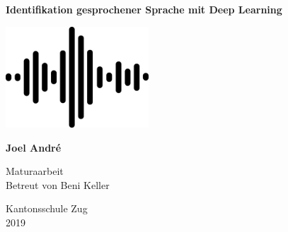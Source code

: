 \begin{titlepage}
    \begin{center}
        \vspace*{1cm}
        
        \Huge
        \textbf{Identifikation gesprochener Sprache mit Deep Learning}
            
        \vspace{4cm}
        
        \includegraphics[width=0.4\textwidth]{assets/front.png}
        
         \vspace{4cm}
        
        \textbf{Joel André}
        \vspace{2.5cm}
        
        
        \Large
        Maturaarbeit\\
        Betreut von
        Beni Keller
        
        \vspace{0.8cm}
        
        
        Kantonsschule Zug\\
        2019
        
    \end{center}
\end{titlepage}